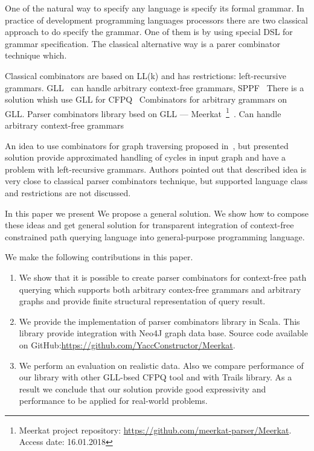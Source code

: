 One of the natural way to specify any language is specify its formal grammar.
In practice of development programming languages processors there are two classical approach to do specify the grammar.
One of them is by using special DSL for grammar specification.
The classical alternative way is a parer combinator technique which.

Classical combinators are based on LL(k) and has restrictions: left-recursive grammars.
GLL~\cite{scott2010gll} can handle arbitrary context-free grammars, SPPF~\cite{SPPF}
There is a solution whish use GLL for CFPQ~\cite{GrigorevR16}
Combinators for arbitrary grammars on GLL. 
Parser combinators library bsed on GLL --- Meerkat~\footnote{Meerkat project repository: \url{https://github.com/meerkat-parser/Meerkat}. Access date: 16.01.2018}~\cite{Meerkat}. 
Can handle arbitrary context-free grammars

An idea to use combinators for graph traversing proposed in~\cite{ScalaGraphParsing}, but presented solution provide approximated handling of cycles in input graph and have a problem with left-recursive grammars. 
Authors pointed out that described idea is very close to classical parser combinators technique, but supported language class and restrictions are not discussed.

In this paper we present We propose a general solution.
We show how to compose these ideas and get general solution for transparent integration of context-free constrained path querying language into general-purpose programming language.

We make the following contributions in this paper.

\begin{enumerate}
\item We show that it is possible to create parser combinators for context-free path querying which supports both arbitrary contex-free grammars and arbitrary graphs and provide finite structural representation of query result.
\item We provide the implementation of parser combinators library in Scala. This library provide integration with Neo4J graph data base. Source code available on GitHub:\url{https://github.com/YaccConstructor/Meerkat}.
\item We perform an evaluation on realistic data. 
Also we compare performance of our library with other GLL-bsed CFPQ tool and with Trails library.
As a result we conclude that our solution provide good expressivity and performance to be applied for real-world problems. 
\end{enumerate}
